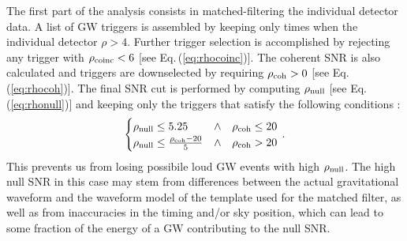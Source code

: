 \documentclass[binding=0.6cm, LaM]{sapthesis}
\begin{document}
	The first part of the analysis consists in matched-filtering the individual detector data.%
	A list of GW triggers is assembled by keeping only times when the individual detector $\rho > 4$.
	Further trigger selection is accomplished by rejecting any trigger with $\rho_{\rm coinc}<6$ [see Eq.\,(\ref{eq:rhocoinc})].
        The coherent SNR is also calculated and triggers are downselected by requiring $\rho_{\rm coh}>0$ [see Eq.\,(\ref{eq:rhocoh})].
	The final SNR cut is performed by computing $\rho_{\rm null}$ [see Eq.\,(\ref{eq:rhonull})] and keeping only the triggers that satisfy the following conditions \cite{46}:
        \begin{equation}
          \begin{cases}
            \rho_{\rm null} \leq 5.25 & \wedge ~~~ \rho_{\rm coh} \leq 20\\
            \rho_{\rm null} \leq {{\rho_{\rm coh}-20}\over {5}} & \wedge ~~~ \rho_{\rm coh} > 20
          \end{cases}\,.
        \end{equation}
	This prevents us from losing possibile loud GW events with high $\rho_{\rm null}$.
	The high null SNR in this case may stem from differences between the actual gravitational waveform and the waveform model of the template used for the matched filter, 
	as well as from inaccuracies in the timing and/or sky position, which can lead to some fraction of the energy of a GW contributing to the null SNR. 	
\end{document}
